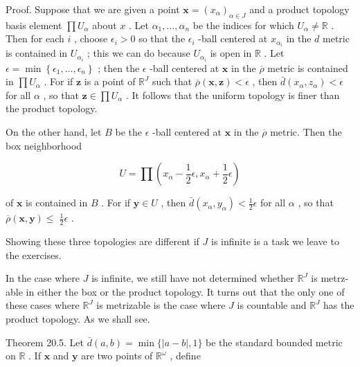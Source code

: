 \documentclass[10pt]{article}
\begin{document}
Proof. Suppose that we are given a point \(\mathbf{x} = {\left( {x}_{\alpha }\right) }_{\alpha  \in  J}\) and a product topology basis element \(\prod {U}_{\alpha }\) about \(x\) . Let \({\alpha }_{1},\ldots ,{\alpha }_{n}\) be the indices for which \({U}_{\alpha } \neq  \mathbb{R}\) . Then for each \(i\) , choose \({\epsilon }_{i} > 0\) so that the \({\epsilon }_{i}\) -ball centered at \({x}_{{\alpha }_{i}}\) in the \(d\) metric is contained in \({U}_{{\alpha }_{i}}\) ; this we can do because \({U}_{{\alpha }_{i}}\) is open in \(\mathbb{R}\) . Let \(\epsilon  = \min \left\{  {{\epsilon }_{1},\ldots ,{\epsilon }_{n}}\right\}\) ; then the \(\epsilon\) -ball centered at \(\mathbf{x}\) in the \(\overline{\rho }\) metric is contained in \(\prod {U}_{\alpha }\) . For if \(\mathbf{z}\) is a point of \({\mathbb{R}}^{J}\) such that \(\overline{\rho }\left( {\mathbf{x},\mathbf{z}}\right)  < \epsilon\) , then \(\bar{d}\left( {{x}_{\alpha },{z}_{\alpha }}\right)  < \epsilon\) for all \(\alpha\) , so that \(\mathbf{z} \in  \prod {U}_{\alpha }\) . It follows that the uniform topology is finer than the product topology.

On the other hand, let \(B\) be the \(\epsilon\) -ball centered at \(\mathbf{x}\) in the \(\overline{\rho }\) metric. Then the box neighborhood

\[
U = \prod \left( {{x}_{\alpha } - \frac{1}{2}\epsilon ,{x}_{\alpha } + \frac{1}{2}\epsilon }\right)
\]

of \(\mathbf{x}\) is contained in \(B\) . For if \(\mathbf{y} \in  U\) , then \(\bar{d}\left( {{x}_{\alpha },{y}_{\alpha }}\right)  < \frac{1}{2}\epsilon\) for all \(\alpha\) , so that \(\overline{\rho }\left( {\mathbf{x},\mathbf{y}}\right)  \leq \; \frac{1}{2}\epsilon\) .

Showing these three topologies are different if \(J\) is infinite is a task we leave to the exercises.

In the case where \(J\) is infinite, we still have not determined whether \({\mathbb{R}}^{J}\) is metrz-able in either the box or the product topology. It turns out that the only one of these cases where \({\mathbb{R}}^{J}\) is metrizable is the case where \(J\) is countable and \({\mathbb{R}}^{J}\) has the product topology. As we shall see.

Theorem 20.5. Let \(\bar{d}\left( {a,b}\right)  = \min \{ \left| {a - b}\right| ,1\}\) be the standard bounded metric on \(\mathbb{R}\) . If \(\mathbf{x}\) and \(\mathbf{y}\) are two points of \({\mathbb{R}}^{\omega }\) , define
\end{document}
